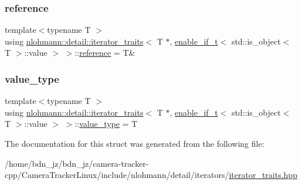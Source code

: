 \subsubsection{\texorpdfstring{reference}{reference}}
{\footnotesize\ttfamily template$<$typename T $>$ \\
using \hyperlink{structnlohmann_1_1detail_1_1iterator__traits}{nlohmann\+::detail\+::iterator\+\_\+traits}$<$ T $\ast$, \hyperlink{namespacenlohmann_1_1detail_a02bcbc878bee413f25b985ada771aa9c}{enable\+\_\+if\+\_\+t}$<$ std\+::is\+\_\+object$<$ T $>$\+::value $>$ $>$\+::\hyperlink{structnlohmann_1_1detail_1_1iterator__traits_3_01_t_01_5_00_01enable__if__t_3_01std_1_1is__objec8d960665487688165530972cda4f1bea_a0809c5949d22f08a993231d2fdf285f0}{reference} =  T\&}

\mbox{\label{structnlohmann_1_1detail_1_1iterator__traits_3_01_t_01_5_00_01enable__if__t_3_01std_1_1is__objec8d960665487688165530972cda4f1bea_a443e6a62f5fb2c545fc71c751b98ca8d}} 
\subsubsection{\texorpdfstring{value\+\_\+type}{value\_type}}
{\footnotesize\ttfamily template$<$typename T $>$ \\
using \hyperlink{structnlohmann_1_1detail_1_1iterator__traits}{nlohmann\+::detail\+::iterator\+\_\+traits}$<$ T $\ast$, \hyperlink{namespacenlohmann_1_1detail_a02bcbc878bee413f25b985ada771aa9c}{enable\+\_\+if\+\_\+t}$<$ std\+::is\+\_\+object$<$ T $>$\+::value $>$ $>$\+::\hyperlink{structnlohmann_1_1detail_1_1iterator__traits_3_01_t_01_5_00_01enable__if__t_3_01std_1_1is__objec8d960665487688165530972cda4f1bea_a443e6a62f5fb2c545fc71c751b98ca8d}{value\+\_\+type} =  T}



The documentation for this struct was generated from the following file\+:\begin{DoxyCompactItemize}
\item 
/home/bdn\+\_\+jz/bdn\+\_\+jz/camera-\/tracker-\/cpp/\+Camera\+Tracker\+Linux/include/nlohmann/detail/iterators/\hyperlink{iterator__traits_8hpp}{iterator\+\_\+traits.\+hpp}\end{DoxyCompactItemize}
